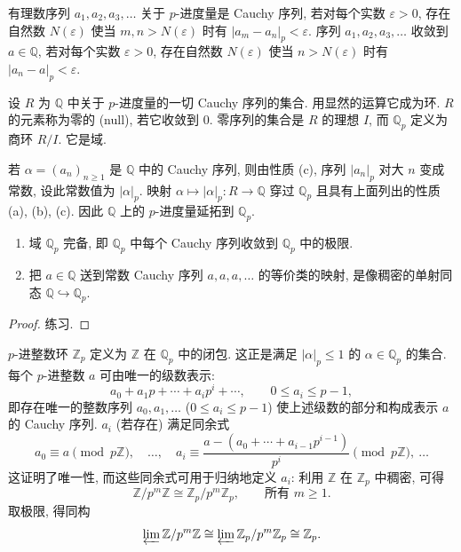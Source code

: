有理数序列 $a_1, a_2, a_3, \dots$ 关于 $p$-进度量是 Cauchy 序列, 若对每个实数 $\varepsilon > 0$, 存在自然数 $N(\varepsilon)$ 使当 $m, n > N(\varepsilon)$ 时有 $|a_m - a_n|_p < \varepsilon$. 序列 $a_1, a_2, a_3, \dots$ 收敛到 $a\in\mathbb{Q}$, 若对每个实数 $\varepsilon > 0$, 存在自然数 $N(\varepsilon)$ 使当 $n > N(\varepsilon)$ 时有 $|a_n - a|_p < \varepsilon$.

设 $R$ 为 $\mathbb{Q}$ 中关于 $p$-进度量的一切 Cauchy 序列的集合. 用显然的运算它成为环. $R$ 的元素称为零的 (null), 若它收敛到 $0$. 零序列的集合是 $R$ 的理想 $I$, 而 $\mathbb{Q}_p$ 定义为商环 $R/I$. 它是域.

若 $\alpha = (a_n)_{n\ge 1}$ 是 $\mathbb{Q}$ 中的 Cauchy 序列, 则由性质 (c), 序列 $|a_n|_p$ 对大 $n$ 变成常数, 设此常数值为 $|\alpha|_p$. 映射 $\alpha\mapsto|\alpha|_p\colon R\to\mathbb{Q}$ 穿过 $\mathbb{Q}_p$ 且具有上面列出的性质 (a), (b), (c). 因此 $\mathbb{Q}$ 上的 $p$-进度量延拓到 $\mathbb{Q}_p$.

\begin{theorem} \label{thm:1.2.5} 
\begin{enumerate}[label=\textup{(\alph*)}]
\item 域 $\mathbb{Q}_p$ 完备, 即 $\mathbb{Q}_p$ 中每个 Cauchy 序列收敛到 $\mathbb{Q}_p$ 中的极限.
\item 把 $a\in\mathbb{Q}$ 送到常数 Cauchy 序列 $a,a,a,\dots$ 的等价类的映射, 是像稠密的单射同态 $\mathbb{Q}\hookrightarrow\mathbb{Q}_p$.
\end{enumerate}
\end{theorem}

\begin{proof}
练习.
\end{proof}

$p$-进整数环 $\mathbb{Z}_p$ 定义为 $\mathbb{Z}$ 在 $\mathbb{Q}_p$ 中的闭包. 这正是满足 $|\alpha|_p\le 1$ 的 $\alpha\in\mathbb{Q}_p$ 的集合. 每个 $p$-进整数 $a$ 可由唯一的级数表示:
\[
a_0 + a_1p + \cdots + a_ip^i + \cdots, \qquad 0\le a_i\le p-1,
\]
即存在唯一的整数序列 $a_0, a_1, \dots$ ($0\le a_i\le p-1$) 使上述级数的部分和构成表示 $a$ 的 Cauchy 序列. $a_i$ (若存在) 满足同余式
\[
a_0\equiv a \pmod{p\mathbb{Z}}, \quad \dots, \quad a_i \equiv \frac{a - (a_0 + \cdots + a_{i-1}p^{i-1})}{p^i} \pmod{p\mathbb{Z}}, \ \dots
\]
这证明了唯一性, 而这些同余式可用于归纳地定义 $a_i$: 利用 $\mathbb{Z}$ 在 $\mathbb{Z}_p$ 中稠密, 可得
\[
\mathbb{Z}/p^m\mathbb{Z} \cong \mathbb{Z}_p/p^m\mathbb{Z}_p, \qquad \text{所有 } m\ge 1.
\]
取极限, 得同构
\[
\varprojlim \mathbb{Z}/p^m\mathbb{Z} \cong \varprojlim \mathbb{Z}_p/p^m\mathbb{Z}_p \cong \mathbb{Z}_p.
\]

